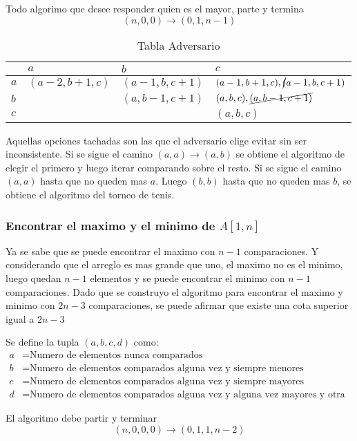 \documentclass[12pt]{article}
\begin{document}
Todo algorimo que desee responder quien es el mayor, parte y termina
\[
(n,0,0) \rightarrow (0,1,n-1)
\]

\begin{table}[htbp]
\centering
\caption{Tabla Adversario}
\begin{tabular}{|l|l|l|l|}
\hline
 & $a$ & $b$ & $c$ \\ \hline
$a$ & $(a-2,b+1,c)$ & $(a-1,b,c+1)$ & $(a-1,b+1,c),\cancel(a-1,b,c+1)$ \\ \hline
$b$ &  & $(a,b-1,c+1)$ & $(a,b,c),\cancel{(a,b-1,c+1)}$ \\ \hline
$c$ &  &  & $(a,b,c)$ \\ \hline
\end{tabular}
\label{}
\end{table}

Aquellas opciones tachadas son las que el adversario elige evitar sin ser inconsistente.
Si se sigue el camino $(a,a)\rightarrow(a,b)$ se obtiene el algoritmo de elegir el primero y luego iterar comparando sobre el resto.
Si se sigue el camino $(a,a)$ hasta que no queden mas $a$. Luego $(b,b)$ hasta que no queden mas $b$, se obtiene el algoritmo del torneo de tenis.

\subsubsection {Encontrar el maximo y el minimo de $A[1,n]$}

Ya se sabe que se puede encontrar el maximo con $n-1$ comparaciones. Y considerando que el arreglo es mas grande que uno, el maximo no es el minimo, luego quedan $n-1$ elementos y se puede encontrar el minimo con $n-1$ comparaciones. Dado que se construyo el algoritmo para encontrar el maximo y minimo con $2n-3$ comparaciones, se puede afirmar que existe una cota superior igual a $2n-3$

Se define la tupla $(a,b,c,d)$ como:
\begin{align}
a &= \text{Numero de elementos nunca comparados} \\
b &= \text{Numero de elementos comparados alguna vez y siempre menores} \\
c &= \text{Numero de elementos comparados alguna vez y siempre mayores} \\
d &= \text{Numero de elementos comparados alguna vez y alguna vez mayores y otra menores} 
\end{align}

El algoritmo debe partir y terminar
\[
(n,0,0,0) \rightarrow (0,1,1,n-2)
\]
\end{document}
